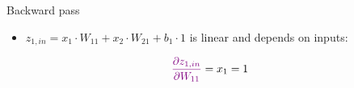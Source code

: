 \begin{vbframe}{Backward pass}
  \begin{itemize}
    \item $z_{1,in} = x_1 \cdot W_{11} + x_2 \cdot W_{21} + b_1 \cdot 1$ is linear
        and depends on inputs:
  \end{itemize}
  \begin{eqnarray*}
    \textcolor{violet}{\frac{\partial z_{1,in}}{\partial W_{11}}} = x_1 = 1
  \end{eqnarray*}
  \begin{figure}
    \centering
  \end{figure}
\framebreak


\end{vbframe}
